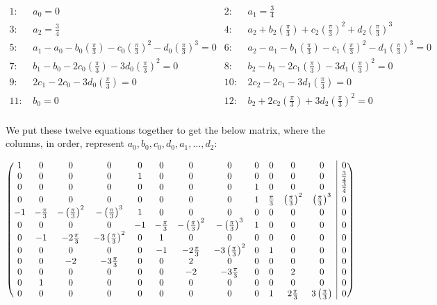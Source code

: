 \documentclass[11pt]{article}
\makeatletter
\newenvironment{amatrix}[1]{%
  \left(\begin{array}{@{}*{#1}{c}|c@{}}
}{%
  \end{array}\right)
}
\makeatother
\begin{document}
\begin{align*}
	\text{1: }&a_0=0 & \text{2: }&a_1=\frac{3}{4}\\
	\text{3: }&a_2=\frac{3}{4} & \text{4: }&a_2+b_2\left(\frac{\pi}{3}\right)+c_2\left(\frac{\pi}{3}\right)^2+d_2\left(\frac{\pi}{3}\right)^3\\
	\text{5: }&a_1-a_0-b_0\left(\frac{\pi}{3}\right)-c_0\left(\frac{\pi}{3}\right)^2-d_0\left(\frac{\pi}{3}\right)^3=0 &
		\text{6: }&a_2-a_1-b_1\left(\frac{\pi}{3}\right)-c_1\left(\frac{\pi}{3}\right)^2-d_1\left(\frac{\pi}{3}\right)^3=0\\
	\text{7: }&b_1-b_0-2c_0\left(\frac{\pi}{3}\right)-3d_0\left(\frac{\pi}{3}\right)^2=0 &
		\text{8: }&b_2-b_1-2c_1\left(\frac{\pi}{3}\right)-3d_1\left(\frac{\pi}{3}\right)^2=0\\
	\text{9: }&2c_1-2c_0-3d_0\left(\frac{\pi}{3}\right)=0 & \text{10: }&2c_2-2c_1-3d_1\left(\frac{\pi}{3}\right)=0\\
	\text{11: }&b_0=0 & \text{12: }&b_2+2c_2\left(\frac{\pi}{3}\right)+3d_2\left(\frac{\pi}{3}\right)^2=0\\
\end{align*}

We put these twelve equations together to get the below matrix, where the
columns, in order, represent $a_0,b_0,c_0,d_0,a_1,\ldots,d_2$:

$\begin{amatrix}{12}
	1 & 0 & 0 & 0 & 0 & 0 & 0 & 0 & 0 & 0 & 0 & 0 & 0\\
	0 & 0 & 0 & 0 & 1 & 0 & 0 & 0 & 0 & 0 & 0 & 0 & \frac{3}{4}\\
	0 & 0 & 0 & 0 & 0 & 0 & 0 & 0 & 1 & 0 & 0 & 0 & \frac{3}{4}\\
	0 & 0 & 0 & 0 & 0 & 0 & 0 & 0 & 1 & \frac{\pi}{3} & \left(\frac{\pi}{3}\right)^2 & \left(\frac{\pi}{3}\right)^3 & 0\\
	-1 & -\frac{\pi}{3} & -\left(\frac{\pi}{3}\right)^2 & -\left(\frac{\pi}{3}\right)^3 & 1 & 0 & 0 & 0 & 0 & 0 & 0 & 0 & 0\\
	0 & 0 & 0 & 0 & -1 & -\frac{\pi}{3} & -\left(\frac{\pi}{3}\right)^2 & -\left(\frac{\pi}{3}\right)^3 & 1 & 0 & 0 & 0 & 0\\
	0 & -1 & -2\frac{\pi}{3} & -3\left(\frac{\pi}{3}\right)^2 & 0 & 1 & 0 & 0 & 0 & 0 & 0 & 0 & 0\\
	0 & 0 & 0 & 0 & 0 & -1 & -2\frac{\pi}{3} & -3\left(\frac{\pi}{3}\right)^2 & 0 & 1 & 0 & 0 & 0\\
	0 & 0 & -2 & -3\frac{\pi}{3} & 0 & 0 & 2 & 0 & 0 & 0 & 0 & 0 & 0\\
	0 & 0 & 0 & 0 & 0 & 0 & -2 & -3\frac{\pi}{3} & 0 & 0 & 2 & 0 & 0\\
	0 & 1 & 0 & 0 & 0 & 0 & 0 & 0 & 0 & 0 & 0 & 0 & 0\\
	0 & 0 & 0 & 0 & 0 & 0 & 0 & 0 & 0 & 1 & 2\frac{\pi}{3} & 3\left(\frac{\pi}{3}\right) & 0\\
\end{amatrix}$
\end{document}
